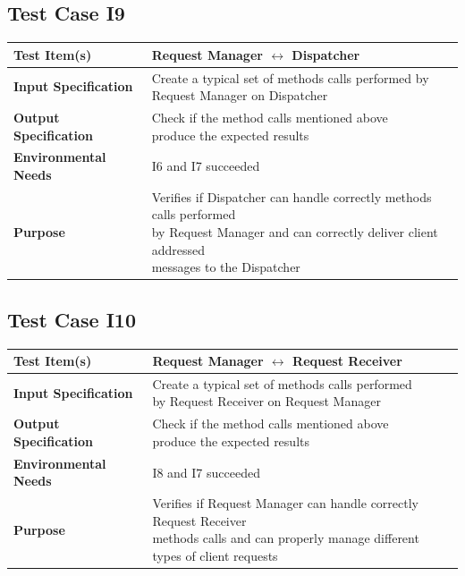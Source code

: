 \documentclass[11pt,titlepage]{article} %
\begin{document}
  
  \subsection{Test Case I9}
  \begin{table}[H]
    \begin{tabular*}{16cm}{ll}
	\hline
	\textbf{Test Item(s)} & Request Manager $ \longleftrightarrow $ Dispatcher \\
	\hline
	\textbf{Input Specification} & \pbox{20cm}{Create a typical set of methods calls performed by \\ Request Manager on Dispatcher} \\
	\hline
	\textbf{Output Specification} & \pbox{20cm}{Check if the method calls mentioned above \\ produce the expected results}\\
	\hline
	\textbf{Environmental Needs} & I6 and I7 succeeded\\
	\hline
	\textbf{Purpose} & \pbox{20cm}{Verifies if Dispatcher can handle correctly methods calls performed \\ by Request Manager
					and can correctly deliver client addressed \\ messages to the Dispatcher} \\
	\hline
    \end{tabular*}
  \end{table}
  
  \subsection{Test Case I10}
  \begin{table}[H]
    \begin{tabular*}{16cm}{ll}
	\hline
	\textbf{Test Item(s)} & Request Manager $ \longleftrightarrow $ Request Receiver \\
	\hline
	\textbf{Input Specification} &  \pbox{20cm}{Create a typical set of methods calls performed \\ by Request Receiver on Request Manager} \\
	\hline
	\textbf{Output Specification} & \pbox{20cm}{Check if the method calls mentioned above \\ produce the expected results} \\
	\hline
	\textbf{Environmental Needs} & I8 and I7 succeeded\\
	\hline
	\textbf{Purpose} & \pbox{20cm}{Verifies if Request Manager can handle correctly Request Receiver \\ methods calls 
					and can properly manage different \\ types of client requests} \\
	\hline
    \end{tabular*}
  \end{table}
  
\end{document}
